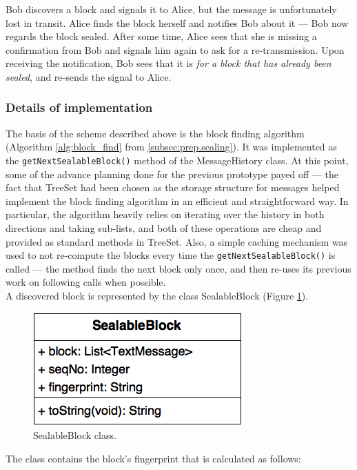 \documentclass[a4paper, 12pt]{report}
\begin{document}
Bob discovers a block and signals it to Alice, but the message is unfortunately lost in transit. Alice finds the block herself and notifies Bob about it --- Bob now regards the block sealed. After some time, Alice sees that she is missing a confirmation from Bob and signals him again to ask for a re-transmission. Upon receiving the notification, Bob sees that it is \emph{for a block that has already been sealed}, and re-sends the signal to Alice. 


\subsubsection{Details of implementation}
The basis of the scheme described above is the block finding algorithm (Algorithm \ref{alg:block_find} from \cref{subsec:prep.sealing}). It was implemented as the \texttt{getNextSealableBlock()} method of the MessageHistory class. At this point, some of the advance planning done for the previous prototype payed off --- the fact that TreeSet had been chosen as the storage structure for messages helped implement the block finding algorithm in an efficient and straightforward way. In particular, the algorithm heavily relies on iterating over the history in both directions and taking sub-lists, and both of these operations are cheap and provided as standard methods in TreeSet. Also, a simple caching mechanism was used to not re-compute the blocks every time the \texttt{getNextSealableBlock()} is called --- the method finds the next block only once, and then re-uses its previous work on following calls when possible.\\

A discovered block is represented by the class SealableBlock (Figure \ref{fig:sealable_block_uml}).

\begin{figure}[H]
    \captionsetup{width=0.80\textwidth}
    \centering
    \includegraphics[width=0.4\linewidth]{pics/sealable_block_uml.png}
    \caption{\label{fig:sealable_block_uml} SealableBlock class.}
\end{figure}

The class contains the block's fingerprint that is calculated as follows:
\end{document}
